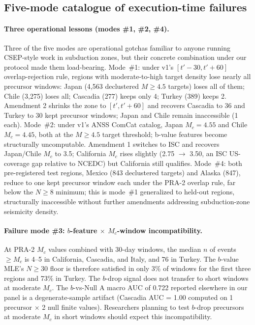 \documentclass[11pt]{article}
\begin{document}
\subsection{Five-mode catalogue of execution-time failures}
\label{sec:results-failure-modes}

\paragraph{Three operational lessons (modes \#1, \#2, \#4).} Three of
the five modes are operational gotchas familiar to anyone running
CSEP-style work in subduction zones, but their concrete combination
under our protocol made them load-bearing. Mode~\#1: under v1's
$[t'-30, t'+60]$ overlap-rejection rule, regions with moderate-to-high
target density lose nearly all precursor windows: Japan (4{,}563
declustered $M{\ge}4.5$ targets) loses all of them; Chile (3{,}275)
loses all; Cascadia (277) keeps only 4; Turkey (389) keeps 2.
Amendment 2 shrinks the zone to $[t', t'+60]$ and recovers Cascadia to
36 and Turkey to 30 kept precursor windows; Japan and Chile remain
inaccessible (1 each). Mode~\#2: under v1's ANSS ComCat catalog, Japan
$M_c = 4.55$ and Chile $M_c = 4.45$, both at the $M{\ge}4.5$ target
threshold; b-value features become structurally uncomputable.
Amendment 1 switches to ISC and recovers Japan/Chile $M_c$ to 3.5;
California $M_c$ rises slightly (2.75 $\to$ 3.50, an ISC US-coverage
gap relative to NCEDC) but California still qualifies. Mode~\#4: both
pre-registered test regions, Mexico (843 declustered targets) and
Alaska (847), reduce to one kept precursor window each under the
PRA-2 overlap rule, far below the $N{\ge}8$ minimum; this is mode~\#1
generalized to held-out regions, structurally inaccessible without
further amendments addressing subduction-zone seismicity density.

\paragraph{Failure mode \#3: $b$-feature $\times$ $M_c$-window
incompatibility.} At PRA-2 $M_c$ values combined with 30-day windows,
the median $n$ of events $\ge M_c$ is 4--5 in California, Cascadia,
and Italy, and 76 in Turkey. The $b$-value MLE's $N{\ge}30$ floor is
therefore satisfied in only 3\% of windows for the first three regions
and 73\% in Turkey. The \citet{gulia2019} $b$-drop signal does not
transfer to short windows at moderate $M_c$. The $b$-vs-Null A macro
AUC of 0.722 reported elsewhere in our panel is a degenerate-sample
artifact (Cascadia AUC = 1.00 computed on 1 precursor $\times$ 2 null
finite values). Researchers planning to test $b$-drop precursors at
moderate $M_c$ in short windows should expect this incompatibility.
\end{document}
